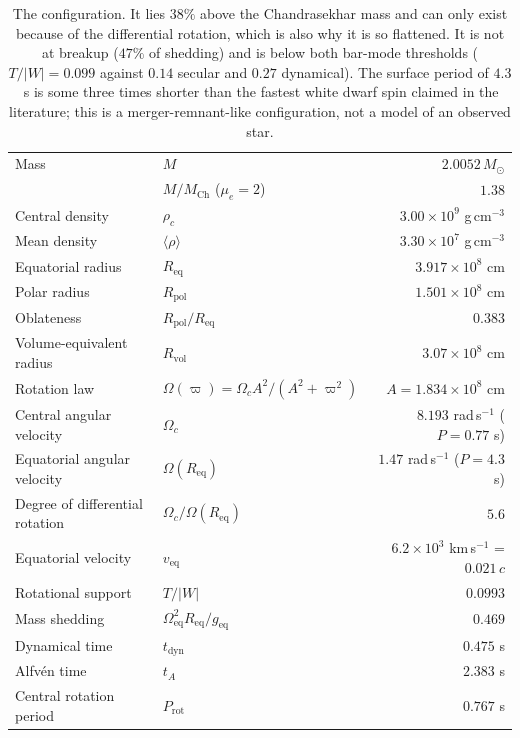 \documentclass[11pt,a4paper]{article}
\newcommand{\Msun}{M_\odot}
\newcommand{\Req}{R_{\mathrm{eq}}}
\newcommand{\Rpol}{R_{\mathrm{pol}}}
\newcommand{\Rvol}{R_{\mathrm{vol}}}
\begin{document}
\begin{table}[h]
\centering\small
\begin{tabular}{llr}
\toprule
Mass & $M$ & $2.0052\,\Msun$ \\
 & $M/M_{\mathrm{Ch}}$ ($\mu_e = 2$) & $\mathbf{1.38}$ \\
Central density & $\rho_c$ & $3.00\times10^{9}$ g\,cm$^{-3}$ \\
Mean density & $\langle\rho\rangle$ & $3.30\times10^{7}$ g\,cm$^{-3}$ \\
Equatorial radius & $\Req$ & $3.917\times10^8$ cm \\
Polar radius & $\Rpol$ & $1.501\times10^8$ cm \\
Oblateness & $\Rpol/\Req$ & $\mathbf{0.383}$ \\
Volume-equivalent radius & $\Rvol$ & $3.07\times10^8$ cm \\
\midrule
Rotation law & $\Omega(\varpi) = \Omega_c A^2/(A^2+\varpi^2)$ & $A = 1.834\times10^8$ cm \\
Central angular velocity & $\Omega_c$ & $8.193$ rad\,s$^{-1}$ \quad ($P = 0.77$ s) \\
Equatorial angular velocity & $\Omega(\Req)$ & $1.47$ rad\,s$^{-1}$ \quad ($P = 4.3$ s) \\
Degree of differential rotation & $\Omega_c/\Omega(\Req)$ & $\mathbf{5.6}$ \\
Equatorial velocity & $v_{\mathrm{eq}}$ & $6.2\times10^3$ km\,s$^{-1}$ = $0.021\,c$ \\
Rotational support & $T/|W|$ & $0.0993$ \\
Mass shedding & $\Omega_{\mathrm{eq}}^2\Req/g_{\mathrm{eq}}$ & $0.469$ \\
\midrule
Dynamical time & $t_{\mathrm{dyn}}$ & $0.475$ s \\
Alfv\'en time & $t_A$ & $2.383$ s \\
Central rotation period & $P_{\mathrm{rot}}$ & $0.767$ s \\
\bottomrule
\end{tabular}
\caption{The configuration. It lies $38\%$ above the Chandrasekhar mass and can
only exist because of the differential rotation, which is also why it is so
flattened. It is not at breakup ($47\%$ of shedding) and is below both bar-mode
thresholds ($T/|W| = 0.099$ against $0.14$ secular and $0.27$ dynamical). The
surface period of $4.3$\,s is some three times shorter than the fastest white
dwarf spin claimed in the literature; this is a merger-remnant-like
configuration, not a model of an observed star.}
\end{table}
\end{document}
